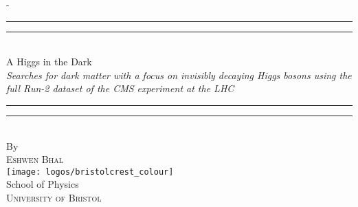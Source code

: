 %
%
% 
%
%
\begin{titlingpage}
\begin{SingleSpace}
\calccentering{\unitlength} 
\begin{adjustwidth*}{\unitlength}{-\unitlength}
\vspace*{13mm}
\begin{center}
\rule[0.5ex]{\linewidth}{2pt}\vspace*{-\baselineskip}\vspace*{3.2pt}
\rule[0.5ex]{\linewidth}{1pt}\\[\baselineskip]
{\HUGE A Higgs in the Dark}\\[4mm] %
{\Large \textit{Searches for dark matter with a focus on invisibly decaying Higgs bosons using the full Run-2 dataset of the CMS experiment at the LHC}}\\ %
\rule[0.5ex]{\linewidth}{1pt}\vspace*{-\baselineskip}\vspace{3.2pt}
\rule[0.5ex]{\linewidth}{2pt}\\
\vspace{6.5mm}
{\large By}\\
\vspace{6.5mm}
{\large\textsc{Eshwen Bhal}}\\  %
\vspace{11mm}
\texttt{[image: logos/bristolcrest\_colour]}\\  %
\vspace{6mm}
{\large School of Physics\\  %
\textsc{University of Bristol}}\\  %
\vspace{11mm}
\begin{minipage}{10cm}

\end{minipage}
\end{center}
\end{adjustwidth*}
\end{SingleSpace}
\end{titlingpage}
